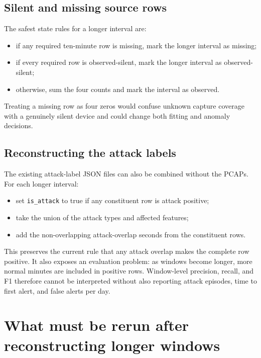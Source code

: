 \documentclass[11pt,a4paper]{article}
\begin{document}
\subsection{Silent and missing source rows}

The safest state rules for a longer interval are:

\begin{itemize}
  \item if any required ten-minute row is missing, mark the longer interval as
        missing;
  \item if every required row is observed-silent, mark the longer interval as
        observed-silent;
  \item otherwise, sum the four counts and mark the interval as observed.
\end{itemize}

Treating a missing row as four zeros would confuse unknown capture coverage
with a genuinely silent device and could change both fitting and anomaly
decisions.

\subsection{Reconstructing the attack labels}

The existing attack-label JSON files can also be combined without the PCAPs.
For each longer interval:

\begin{itemize}
  \item set \texttt{is\_attack} to true if any constituent row is attack
        positive;
  \item take the union of the attack types and affected features;
  \item add the non-overlapping attack-overlap seconds from the constituent
        rows.
\end{itemize}

This preserves the current rule that any attack overlap makes the complete row
positive.  It also exposes an evaluation problem: as windows become longer,
more normal minutes are included in positive rows.  Window-level precision,
recall, and F1 therefore cannot be interpreted without also reporting attack
episodes, time to first alert, and false alerts per day.

\section{What must be rerun after reconstructing longer windows}
\end{document}
